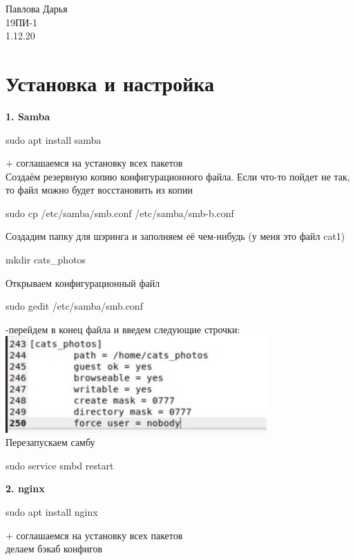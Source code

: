 \documentclass[12pt,a4paper]{scrartcl}
\author{Даря}
\begin{document}
\begin{flushright}
  Павлова Дарья\\
  19ПИ-1\\
  1.12.20\\
\end{flushright}

\section{Установка и настройка}
\textnumero \textbf{1. Samba}
\\[5pt]
\begin{center}
 sudo apt install samba
\end{center}
+ соглашаемся на установку всех пакетов
\\[5pt]
Создаём резервную копию конфигурационного файла. Если что-то пойдет не так, то файл можно будет восстановить из копии
\begin{center}
sudo cp /etc/samba/smb.conf /etc/samba/smb-b.conf
\end{center}
Создадим папку для шэринга и заполняем её чем-нибудь (у меня это файл cat1)
\begin{center}
mkdir cats\_photos
\end{center}
Открываем конфигурационный файл 
\begin{center}
sudo gedit /etc/samba/smb.conf 
\end{center}
-перейдем в конец файла и введем следующие строчки:
\\[5pt]
\includegraphics[scale=10, width=10cm]{f1}
\\[5pt]
Перезапускаем самбу
\\[5pt]
\begin{center}
sudo service smbd restart
\end{center}
\textnumero \textbf{2. nginx} \\[5pt]
\begin{center}
sudo apt install nginx
\end{center}
+ соглашаемся на установку всех пакетов \\[5pt]
делаем бэкаб конфигов \\[5pt]
\end{document}
